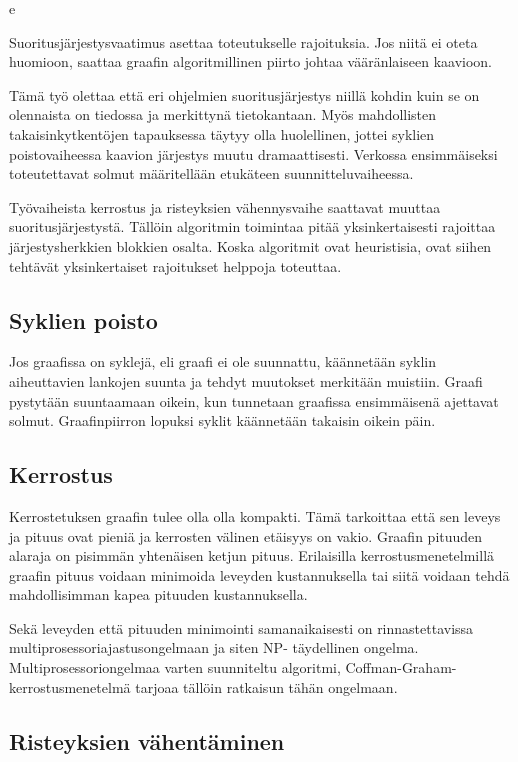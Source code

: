e	\documentclass[finnish,12pt]{article}
\begin{document}
Suoritusjärjestysvaatimus asettaa toteutukselle rajoituksia. Jos niitä ei oteta
huomioon, saattaa graafin algoritmillinen piirto johtaa vääränlaiseen kaavioon.

Tämä työ olettaa että eri ohjelmien suoritusjärjestys niillä kohdin kuin se on
olennaista on tiedossa ja merkittynä tietokantaan.
Myös mahdollisten takaisinkytkentöjen tapauksessa täytyy olla huolellinen,
jottei syklien poistovaiheessa kaavion järjestys muutu dramaattisesti.
Verkossa ensimmäiseksi toteutettavat solmut määritellään etukäteen suunnitteluvaiheessa.

Työvaiheista kerrostus ja risteyksien vähennysvaihe saattavat muuttaa suoritusjärjestystä.
Tällöin algoritmin toimintaa pitää yksinkertaisesti rajoittaa järjestysherkkien blokkien osalta.
Koska algoritmit ovat heuristisia, ovat siihen tehtävät yksinkertaiset rajoitukset helppoja toteuttaa.

		\subsection{Syklien poisto}

Jos graafissa on syklejä, eli graafi ei ole suunnattu, käännetään syklin
aiheuttavien lankojen suunta ja tehdyt muutokset merkitään muistiin.
Graafi pystytään suuntaamaan oikein, kun tunnetaan graafissa ensimmäisenä ajettavat solmut.
Graafinpiirron lopuksi syklit käännetään takaisin oikein päin.

		\subsection{Kerrostus}

Kerrostetuksen graafin tulee olla olla kompakti. Tämä tarkoittaa että sen leveys
ja pituus ovat pieniä ja kerrosten välinen etäisyys on vakio. Graafin pituuden
alaraja on pisimmän yhtenäisen ketjun pituus.
Erilaisilla kerrostusmenetelmillä graafin pituus voidaan
minimoida leveyden kustannuksella tai siitä voidaan tehdä mahdollisimman kapea
pituuden kustannuksella.

Sekä leveyden että pituuden minimointi samanaikaisesti on rinnastettavissa
multiprosessoriajastusongelmaan ja siten NP- täydellinen ongelma.
\cite{RefWorks:39} Multiprosessoriongelmaa varten suunniteltu algoritmi,
Coffman-Graham-kerrostusmenetelmä tarjoaa tällöin ratkaisun tähän ongelmaan.

		\subsection{Risteyksien vähentäminen}
\end{document}
